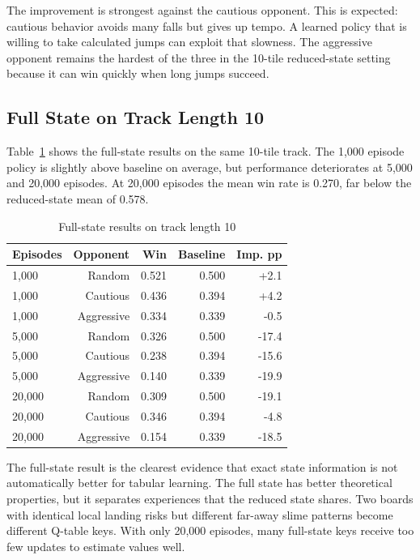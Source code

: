 \documentclass[conference]{IEEEtran}
\begin{document}
The improvement is strongest against the cautious opponent. This is expected:
cautious behavior avoids many falls but gives up tempo. A learned policy that is
willing to take calculated jumps can exploit that slowness. The aggressive
opponent remains the hardest of the three in the 10-tile reduced-state setting
because it can win quickly when long jumps succeed.

\subsection{Full State on Track Length 10}

Table~\ref{tab:l10full} shows the full-state results on the same 10-tile track.
The 1,000 episode policy is slightly above baseline on average, but performance
deteriorates at 5,000 and 20,000 episodes. At 20,000 episodes the mean win rate is
0.270, far below the reduced-state mean of 0.578.

\begin{table}[h]
\centering
\caption{Full-state results on track length 10}
\label{tab:l10full}
\begin{tabular}{lrrrr}
\toprule
Episodes & Opponent & Win & Baseline & Imp. pp \\
\midrule
1,000 & Random & 0.521 & 0.500 & +2.1 \\
1,000 & Cautious & 0.436 & 0.394 & +4.2 \\
1,000 & Aggressive & 0.334 & 0.339 & -0.5 \\
5,000 & Random & 0.326 & 0.500 & -17.4 \\
5,000 & Cautious & 0.238 & 0.394 & -15.6 \\
5,000 & Aggressive & 0.140 & 0.339 & -19.9 \\
20,000 & Random & 0.309 & 0.500 & -19.1 \\
20,000 & Cautious & 0.346 & 0.394 & -4.8 \\
20,000 & Aggressive & 0.154 & 0.339 & -18.5 \\
\bottomrule
\end{tabular}
\end{table}

The full-state result is the clearest evidence that exact state information is not
automatically better for tabular learning. The full state has better theoretical
properties, but it separates experiences that the reduced state shares. Two boards
with identical local landing risks but different far-away slime patterns become
different Q-table keys. With only 20,000 episodes, many full-state keys receive too
few updates to estimate values well.
\end{document}
